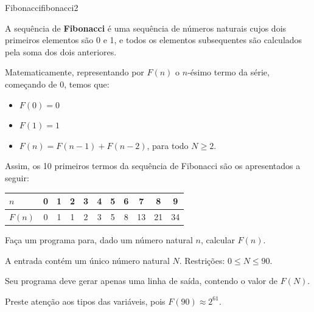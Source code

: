 \documentclass[12pt,a4paper,oneside]{article}
\begin{document}
\begin{problem}{Fibonacci}{fibonacci}{2}
 
A sequência de \textbf{Fibonacci} é uma sequência de números naturais cujos dois primeiros elementos são 0 e 1, e todos os elementos subsequentes são calculados pela soma dos dois anteriores.

Matematicamente, representando por $F(n)$ o $n$-ésimo termo da série, começando de 0, temos que:

\begin{itemize}
\vspace{-2pt}
    \item $F(0) = 0$
\vspace{-2pt}
    \item $F(1) = 1$
\vspace{-2pt}
    \item $F(n) = F(n-1) + F(n-2)$, para todo $N \geq 2$.
\end{itemize}

Assim, os 10 primeiros termos da sequência de Fibonacci são os apresentados a seguir:

\begin{center}
\begin{tabular}{l|cccccccccc}
    $n$    & 0 & 1 & 2 & 3 & 4 & 5 & 6 & 7 & 8 & 9 \\
    \hline
    $F(n)$ & 0 & 1 & 1 & 2 & 3 & 5 & 8 & 13 & 21 & 34 
\end{tabular}
\end{center}

Faça um programa para, dado um número natural $n$, calcular $F(n)$.

%

\InputFile

A entrada contém um único número natural $N$. Restrições: $0 \leq N \leq 90$.


\OutputFile

Seu programa deve gerar apenas uma linha de saída, contendo o valor de $F(N)$.

\Notes
Preste atenção aos tipos das variáveis, pois $F(90) \approx 2^{61}$.

\Example

\begin{example}
%
\end{example}

\begin{example}
%
\end{example}

\begin{example}
%
\end{example}



\end{problem}
\end{document}
